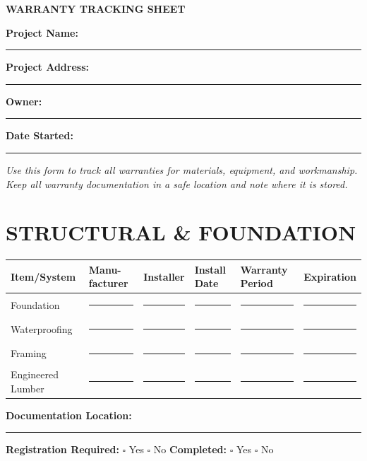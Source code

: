 \documentclass[11pt,letterpaper]{article}
\begin{document}
\begin{center}
\textbf{\Large WARRANTY TRACKING SHEET}
\end{center}

\vspace{12pt}

\textbf{Project Name:} \rule{8cm}{0.4pt}

\textbf{Project Address:} \rule{8cm}{0.4pt}

\textbf{Owner:} \rule{9cm}{0.4pt}

\textbf{Date Started:} \rule{4cm}{0.4pt}

\vspace{6pt}

\textit{Use this form to track all warranties for materials, equipment, and workmanship. Keep all warranty documentation in a safe location and note where it is stored.}

\vspace{12pt}

\section*{STRUCTURAL \& FOUNDATION}

\begin{tabular}{|p{1.5in}|p{1in}|p{1in}|p{0.8in}|p{0.8in}|p{1in}|}
\hline
\textbf{Item/System} & \textbf{Manu-facturer} & \textbf{Installer} & \textbf{Install Date} & \textbf{Warranty Period} & \textbf{Expiration} \\
\hline
Foundation & \rule{0.8in}{0.4pt} & \rule{0.8in}{0.4pt} & \rule{0.6in}{0.4pt} & \rule{0.6in}{0.4pt} & \rule{0.8in}{0.4pt} \\
\hline
Waterproofing & \rule{0.8in}{0.4pt} & \rule{0.8in}{0.4pt} & \rule{0.6in}{0.4pt} & \rule{0.6in}{0.4pt} & \rule{0.8in}{0.4pt} \\
\hline
Framing & \rule{0.8in}{0.4pt} & \rule{0.8in}{0.4pt} & \rule{0.6in}{0.4pt} & \rule{0.6in}{0.4pt} & \rule{0.8in}{0.4pt} \\
\hline
Engineered Lumber & \rule{0.8in}{0.4pt} & \rule{0.8in}{0.4pt} & \rule{0.6in}{0.4pt} & \rule{0.6in}{0.4pt} & \rule{0.8in}{0.4pt} \\
\hline
\end{tabular}

\vspace{6pt}

\textbf{Documentation Location:} \rule{8cm}{0.4pt}

\textbf{Registration Required:} $\square$ Yes $\square$ No \hspace{0.3in} \textbf{Completed:} $\square$ Yes $\square$ No
\end{document}
